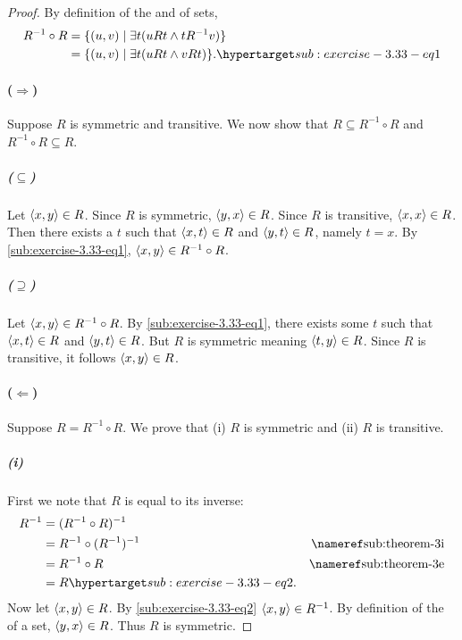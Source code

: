 \documentclass{report}
\begin{document}
  \begin{proof}
    By definition of the  and 
      of sets,
      \begin{align}
        R^{-1} \circ R
          & = \{ (u, v) \mid \exists t(uRt \land tR^{-1}v) \}
            \nonumber \\
          & = \{ (u, v) \mid \exists t(uRt \land vRt) \}.
            \hyperlabel{sub:exercise-3.33-eq1}
      \end{align}

    \paragraph{($\Rightarrow$)}%

      Suppose $R$ is symmetric and transitive.
      We now show that $R \subseteq R^{-1} \circ R$ and
        $R^{-1} \circ R \subseteq R$.

      \subparagraph{($\subseteq$)}%

        Let $\left< x, y \right> \in R$.
        Since $R$ is symmetric, $\left< y, x \right> \in R$.
        Since $R$ is transitive, $\left< x, x \right> \in R$.
        Then there exists a $t$ such that $\left< x, t \right> \in R$ and
          $\left< y, t \right> \in R$, namely $t = x$.
        By \eqref{sub:exercise-3.33-eq1},
          $\left< x, y \right> \in R^{-1} \circ R$.

      \subparagraph{($\supseteq$)}%

        Let $\left< x, y \right> \in R^{-1} \circ R$.
        By \eqref{sub:exercise-3.33-eq1}, there exists some $t$ such that
          $\left< x, t \right> \in R$ and $\left< y, t \right> \in R$.
        But $R$ is symmetric meaning $\left< t, y \right> \in R$.
        Since $R$ is transitive, it follows $\left< x, y \right> \in R$.

    \paragraph{($\Leftarrow$)}%

      Suppose $R = R^{-1} \circ R$.
      We prove that (i) $R$ is symmetric and (ii) $R$ is transitive.

      \subparagraph{(i)}%

        First we note that $R$ is equal to its inverse:
          \begin{align}
            R^{-1}
              & = (R^{-1} \circ R)^{-1} \nonumber \\
              & = R^{-1} \circ (R^{-1})^{-1}
                & \textref{sub:theorem-3i} \nonumber \\
              & = R^{-1} \circ R
                & \textref{sub:theorem-3e} \nonumber \\
              & = R \hyperlabel{sub:exercise-3.33-eq2}.
          \end{align}
        Now let $\left< x, y \right> \in R$.
        By \eqref{sub:exercise-3.33-eq2} $\left< x, y \right> \in R^{-1}$.
        By definition of the  of a set,
          $\left< y, x \right> \in R$.
        Thus $R$ is symmetric.


\end{proof}
\end{document}
